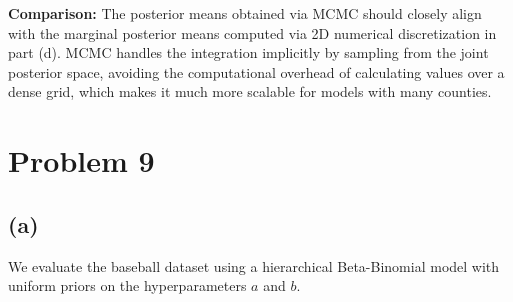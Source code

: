 \documentclass[
  letterpaper,
  DIV=11,
  numbers=noendperiod]{scrartcl}
\begin{document}
\textbf{Comparison:} The posterior means obtained via MCMC should
closely align with the marginal posterior means computed via 2D
numerical discretization in part (d). MCMC handles the integration
implicitly by sampling from the joint posterior space, avoiding the
computational overhead of calculating values over a dense grid, which
makes it much more scalable for models with many counties.

\section{Problem 9}\label{problem-9}

\subsection{(a)}\label{a-6}

We evaluate the baseball dataset using a hierarchical Beta-Binomial
model with uniform priors on the hyperparameters \(a\) and \(b\).
\end{document}
